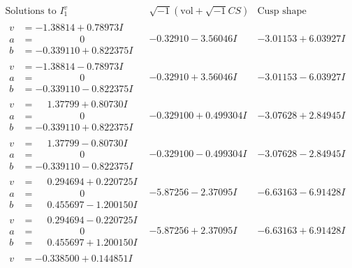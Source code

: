 \documentclass[1p]{elsarticle_modified}
\theoremstyle{definition}
\newcommand{\I}{\sqrt{-1}}
\begin{document}
$$\begin{array}{c|c|c}  
\text{Solutions to }I^v_{1}& \I (\text{vol} + \sqrt{-1}CS) & \text{Cusp shape}\\
 \hline 
\begin{aligned}
v &= -1.38814 + 0.78973 I \\
a &= \phantom{-0.000000 } 0 \\
b &= -0.339110 + 0.822375 I\end{aligned}
 & -0.32910 - 3.56046 I & -3.01153 + 6.03927 I \\ \hline\begin{aligned}
v &= -1.38814 - 0.78973 I \\
a &= \phantom{-0.000000 } 0 \\
b &= -0.339110 - 0.822375 I\end{aligned}
 & -0.32910 + 3.56046 I & -3.01153 - 6.03927 I \\ \hline\begin{aligned}
v &= \phantom{-}1.37799 + 0.80730 I \\
a &= \phantom{-0.000000 } 0 \\
b &= -0.339110 + 0.822375 I\end{aligned}
 & -0.329100 + 0.499304 I & -3.07628 + 2.84945 I \\ \hline\begin{aligned}
v &= \phantom{-}1.37799 - 0.80730 I \\
a &= \phantom{-0.000000 } 0 \\
b &= -0.339110 - 0.822375 I\end{aligned}
 & -0.329100 - 0.499304 I & -3.07628 - 2.84945 I \\ \hline\begin{aligned}
v &= \phantom{-}0.294694 + 0.220725 I \\
a &= \phantom{-0.000000 } 0 \\
b &= \phantom{-}0.455697 - 1.200150 I\end{aligned}
 & -5.87256 - 2.37095 I & -6.63163 - 6.91428 I \\ \hline\begin{aligned}
v &= \phantom{-}0.294694 - 0.220725 I \\
a &= \phantom{-0.000000 } 0 \\
b &= \phantom{-}0.455697 + 1.200150 I\end{aligned}
 & -5.87256 + 2.37095 I & -6.63163 + 6.91428 I \\ \hline\begin{aligned}
v &= -0.338500 + 0.144851 I \\

\end{aligned}
\end{array}$$
\end{document}

